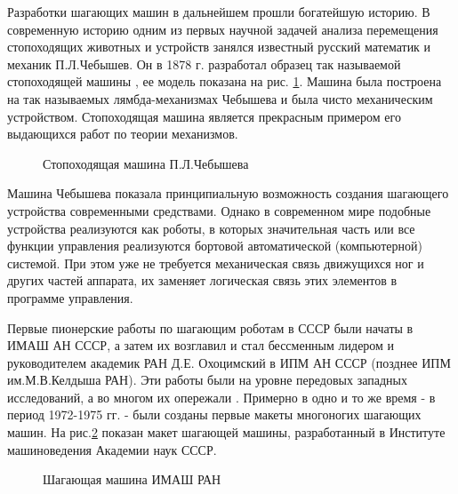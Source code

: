 Разработки шагающих машин в дальнейшем прошли богатейшую историю. В современную историю одним из первых научной задачей анализа перемещения стопоходящих животных и устройств занялся известный русский математик и механик П.Л.Чебышев. Он в 1878 г. разработал образец так называемой стопоходящей машины \cite{..1945}, ее модель показана на рис. \ref{fig7}. Машина была построена на так называемых лямбда-механизмах Чебышева и была чисто механическим устройством. Стопоходящая машина является прекрасным примером его выдающихся работ по теории механизмов. 

\begin{figure}[here]
\caption{Стопоходящая машина П.Л.Чебышева}
\label{fig7}
\end{figure}

Машина Чебышева показала принципиальную возможность создания шагающего устройства современными средствами. Однако в современном мире подобные устройства реализуются как роботы, в которых значительная часть или все функции управления реализуются бортовой автоматической (компьютерной) системой. При этом уже не требуется механическая связь движущихся ног и других частей аппарата, их заменяет логическая связь этих элементов в программе управления.


Первые пионерские работы по шагающим роботам в СССР были начаты в ИМАШ АН СССР, а затем их возглавил и стал бессменным лидером и руководителем академик РАН Д.Е. Охоцимский в ИПМ АН СССР (позднее ИПМ им.М.В.Келдыша РАН). Эти работы были на уровне передовых западных исследований, а во многом их опережали \cite{1984,1982,1972a,1978,1971,1974,1972,1974d,1977,1986b}.
Примерно в одно и то же время - в период 1972-1975 гг. - были созданы первые макеты многоногих шагающих машин. На рис.\ref{fig8} показан макет шагающей машины, разработанный в Институте машиноведения Академии наук СССР.

\begin{figure}[here]
\caption{Шагающая машина ИМАШ РАН}
\label{fig8}
\end{figure}

